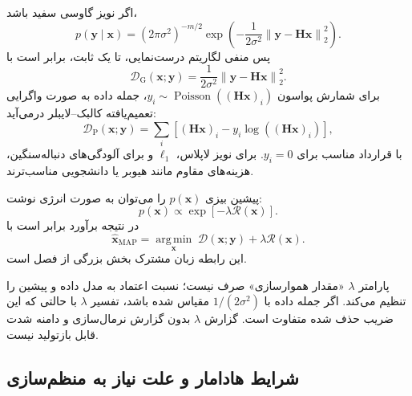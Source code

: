 \documentclass[12pt,openany,oneside]{book}
\newcommand{\norm}[1]{\left\lVert #1\right\rVert}
\newcommand{\vect}[1]{\bm{#1}}
\newcommand{\argmin}{\operatorname*{arg\,min}}
\newcommand{\Poisson}{\operatorname{Poisson}}
\begin{document}
اگر نویز گاوسی سفید باشد،
\begin{equation}
p(\vect y\mid\vect x)
=(2\pi\sigma^2)^{-m/2}
\exp\!\left(-\frac{1}{2\sigma^2}\norm{\vect y-\vect H\vect x}_2^2\right).
\end{equation}
پس منفی لگاریتم درست‌نمایی، تا یک ثابت، برابر است با
\begin{equation}
\mathcal D_{\mathrm G}(\vect x;\vect y)
=\frac{1}{2\sigma^2}\norm{\vect y-\vect H\vect x}_2^2.
\label{eq:gaussian-data-term}
\end{equation}
برای شمارش پواسون \(y_i\sim\Poisson((\vect H\vect x)_i)\)، جمله داده به صورت واگرایی تعمیم‌یافته کالبک--لایبلر درمی‌آید:
\begin{equation}
\mathcal D_{\mathrm P}(\vect x;\vect y)
=\sum_i\left[(\vect H\vect x)_i-y_i\log((\vect H\vect x)_i)\right],
\label{eq:poisson-data-term}
\end{equation}
با قرارداد مناسب برای \(y_i=0\). برای نویز لاپلاس، \(\ell_1\) و برای آلودگی‌های دنباله‌سنگین، هزینه‌های مقاوم مانند هیوبر یا دانشجویی مناسب‌ترند.

پیشین بیزی \(p(\vect x)\) را می‌توان به صورت انرژی نوشت:
\begin{equation}
p(\vect x)\propto \exp[-\lambda\mathcal R(\vect x)].
\end{equation}
در نتیجه برآورد  برابر است با
\begin{equation}
\widehat{\vect x}_{\mathrm{MAP}}
=\argmin_{\vect x}\;\mathcal D(\vect x;\vect y)+\lambda\mathcal R(\vect x).
\label{eq:master-variational}
\end{equation}
این رابطه زبان مشترک بخش بزرگی از فصل است.

\begin{warningbox}
پارامتر \(\lambda\) «مقدار هموارسازی» صرف نیست؛ نسبت اعتماد به مدل داده و پیشین را تنظیم می‌کند.
اگر جمله داده با \(1/(2\sigma^2)\) مقیاس شده باشد، تفسیر \(\lambda\) با حالتی که این ضریب حذف شده متفاوت است.
گزارش \(\lambda\) بدون گزارش نرمال‌سازی و دامنه شدت قابل بازتولید نیست.
\end{warningbox}

\subsection{شرایط هادامار و علت نیاز به منظم‌سازی}
\end{document}

